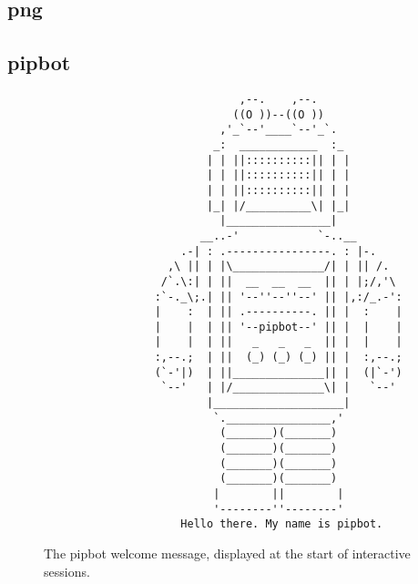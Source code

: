 \subsection{png}


\newpage
\subsection{pipbot}\label{sec:pipbot}


\begin{figure}[H]
\begin{verbatim}
                              ,--.    ,--.
                             ((O ))--((O ))
                           ,'_`--'____`--'_`.
                          _:  ____________  :_
                         | | ||::::::::::|| | |
                         | | ||::::::::::|| | |
                         | | ||::::::::::|| | |
                         |_| |/__________\| |_|
                           |________________|
                        __..-'            `-..__
                     .-| : .----------------. : |-.
                   ,\ || | |\______________/| | || /.
                  /`.\:| | ||  __  __  __  || | |;/,'\
                 :`-._\;.| || '--''--''--' || |,:/_.-':
                 |    :  | || .----------. || |  :    |
                 |    |  | || '--pipbot--' || |  |    |
                 |    |  | ||   _   _   _  || |  |    |
                 :,--.;  | ||  (_) (_) (_) || |  :,--.;
                 (`-'|)  | ||______________|| |  (|`-')
                  `--'   | |/______________\| |   `--'
                         |____________________|
                          `.________________,'
                           (_______)(_______)
                           (_______)(_______)
                           (_______)(_______)
                           (_______)(_______)
                          |        ||        |
                          '--------''--------'
                     Hello there. My name is pipbot.
\end{verbatim}
\caption[The pipbot welcome message]
  {The pipbot welcome message, displayed at the start of interactive sessions.}
\label{fig:pipbot-logo}
\end{figure}


